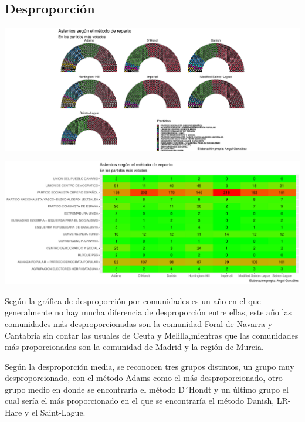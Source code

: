 \documentclass[12pt,a4paper,]{book}
\numberwithin{dummy}{section}
\theoremstyle{ocrenumbox}
\theoremstyle{blacknumex}
\theoremstyle{blacknumbox}
\theoremstyle{ocrenum}
\theoremstyle{ocrenum}
\begin{document}
\hypertarget{desproporciuxf3n-2}{%
\subsection{Desproporción}\label{desproporciuxf3n-2}}

\begin{center}\includegraphics[width=1\linewidth]{figurasR/unnamed-chunk-80-1} \end{center}

\begin{center}\includegraphics[width=1\linewidth]{figurasR/unnamed-chunk-80-2} \end{center}

Según la gráfica de desproporción por comunidades es un año en el que
generalmente no hay mucha diferencia de desproporción entre ellas, este
año las comunidades más desproporcionadas son la comunidad Foral de
Navarra y Cantabria sin contar las usuales de Ceuta y Melilla,mientras
que las comunidades más proporcionadas son la comunidad de Madrid y la
región de Murcia.

Según la desproporción media, se reconocen tres grupos distintos, un
grupo muy desproporcionado, con el método Adams como el más
desproporcionado, otro grupo medio en donde se encontraría el método
D´Hondt y un último grupo el cual sería el más proporcionado en el que
se encontraría el método Danish, LR-Hare y el Saint-Lague.
\end{document}
